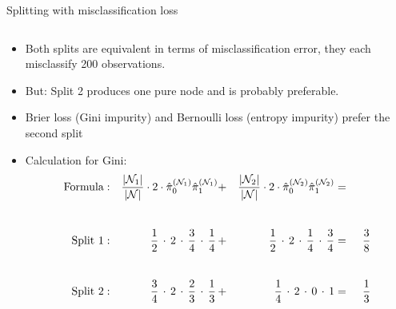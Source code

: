 \documentclass[11pt,compress,t,notes=noshow, xcolor=table]{beamer}
\begin{document}
\begin{vbframe}{Splitting with misclassification loss}
\begin{small}
\begin{columns}[T,onlytextwidth]
\begin{center}
\end{center}
\end{columns}
\end{small}

\lz

\begin{itemize}
\item Both splits are equivalent in terms of misclassification error, they each misclassify 200 observations. 
\item But: Split 2 produces one pure node and is probably preferable.
\item Brier loss (Gini impurity) and Bernoulli loss (entropy impurity) prefer the second split
\item Calculation for Gini:\\
\begin{alignat*}{6}
\text{Formula}&:& \frac{|\Nl|}{|\Np|}\cdot 2 \cdot\pikNlh[0]\pikNlh[1] &+& \frac{|\Nr|}{|\Np|}\cdot 2 \cdot \pikNrh[0]\pikNrh[1] &=& \\[5ex]
\text{Split 1}&:& \,\, \frac{1}{2} \,\cdot \, 2 \,\cdot\, \frac{3}{4} \,\cdot\, \frac{1}{4} \,&+&\,  \, \frac{1}{2} \,\cdot\, 2 \, \cdot\, \frac{1}{4} \,\cdot\, \frac{3}{4} &=&\;\, \frac{3}{8}\\[5ex]
\text{Split 2}&:& \frac{3}{4}\, \cdot\, 2 \,\cdot\,\frac{2}{3}\,\cdot\,\frac{1}{3}\, &+& \frac{1}{4} \,\cdot\, 2 \,\cdot\, 0 \,\cdot\, 1 &=&\; \,\frac{1}{3}
\end{alignat*}
\end{itemize}
\end{vbframe}
\end{document}
